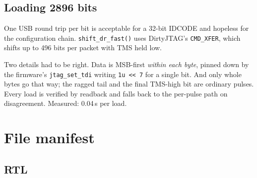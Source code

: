 \documentclass[11pt,a4paper]{article}
\begin{document}
\subsection{Loading 2896 bits}

One USB round trip per bit is acceptable for a 32-bit IDCODE and hopeless for the
configuration chain. \texttt{shift\_dr\_fast()} uses DirtyJTAG's
\texttt{CMD\_XFER}, which shifts up to 496 bits per packet with TMS held low.

Two details had to be right. Data is MSB-first \emph{within each byte}, pinned
down by the firmware's \texttt{jtag\_set\_tdi} writing \texttt{1u << 7} for a
single bit. And only whole bytes go that way; the ragged tail and the final
TMS-high bit are ordinary pulses. Every load is verified by readback and falls
back to the per-pulse path on disagreement. Measured: 0.04\,s per load.

\section{File manifest}

\subsection{RTL}
\end{document}
